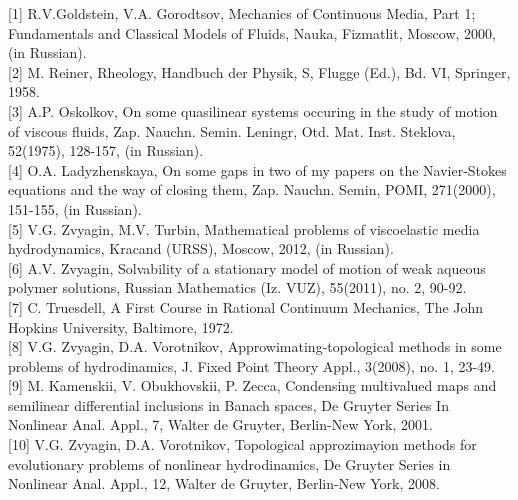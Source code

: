 [1] R.V.Goldstein, V.A. Gorodtsov, Mechanics of Continuous Media, Part 1; Fundamentals and
Classical Models of Fluids, Nauka, Fizmatlit, Moscow, 2000, (in Russian).\\

[2] M. Reiner, Rheology, Handbuch der Physik, S, Flugge (Ed.), Bd. VI, Springer, 1958.\\

[3] A.P. Oskolkov, On some quasilinear systems occuring in the study of motion of viscous fluids,
Zap. Nauchn. Semin. Leningr, Otd. Mat. Inst. Steklova, 52(1975), 128-157, (in Russian).\\

[4] O.A. Ladyzhenskaya, On some gaps in two of my papers on the Navier-Stokes equations and
the way of closing them, Zap. Nauchn. Semin, POMI, 271(2000), 151-155, (in Russian).\\

[5] V.G. Zvyagin, M.V. Turbin, Mathematical problems of viscoelastic media hydrodynamics, Kracand (URSS), 
Moscow, 2012, (in Russian).\\

[6] A.V. Zvyagin, Solvability of a stationary model of motion of weak aqueous polymer solutions,
Russian Mathematics (Iz. VUZ), 55(2011), no. 2, 90-92.\\

[7] C. Truesdell, A First Course in Rational Continuum Mechanics, The John Hopkins University,
Baltimore, 1972.\\

[8] V.G. Zvyagin, D.A. Vorotnikov, Approwimating-topological methods in some problems of hydrodinamics, 
J. Fixed Point Theory Appl., 3(2008), no. 1, 23-49.\\

[9] M. Kamenskii, V. Obukhovskii, P. Zecca, Condensing multivalued maps and semilinear differential 
inclusions in Banach spaces, De Gruyter Series In Nonlinear Anal. Appl., 7, Walter de Gruyter, Berlin-New York, 2001.\\

[10] V.G. Zvyagin, D.A. Vorotnikov, Topological approzimayion methods for evolutionary problems
of nonlinear hydrodinamics, De Gruyter Series in Nonlinear Anal. Appl., 12, Walter de Gruyter, Berlin-New York, 2008.


